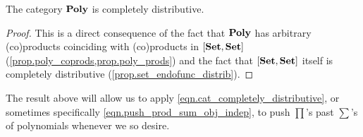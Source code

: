 \documentclass[Book-Poly]{subfiles}
\begin{document}
\begin{corollary} \label{prop.poly_completely_distributive}
The category $\mathbf{Poly}$ is completely distributive.
\end{corollary}
\begin{proof}
This is a direct consequence of the fact that $\mathbf{Poly}$ has arbitrary (co)products coinciding with (co)products in $[\mathbf{Set},\mathbf{Set}]$ (\cref{prop.poly_coprods,prop.poly_prods}) and the fact that $[\mathbf{Set},\mathbf{Set}]$ itself is completely distributive (\cref{prop.set_endofunc_distrib}).
\end{proof}

The result above will allow us to apply \eqref{eqn.cat_completely_distributive}, or sometimes specifically \eqref{eqn.push_prod_sum_obj_indep}, to push $\prod$'s past $\sum$'s of polynomials whenever we so desire.
\end{document}
